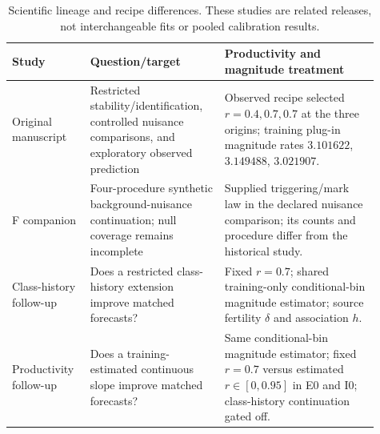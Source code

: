 \begin{table}[tbp]
\centering\small
\caption{Scientific lineage and recipe differences. These studies are
related releases, not interchangeable fits or pooled calibration results.}
\label{a2:recipe}
\begin{tabular}{>{\raggedright\arraybackslash}p{0.18\linewidth}>{\raggedright\arraybackslash}p{0.34\linewidth}>{\raggedright\arraybackslash}p{0.39\linewidth}}
\toprule
Study & Question/target & Productivity and magnitude treatment\\
\midrule
Original manuscript &
Restricted stability/identification, controlled nuisance comparisons,
and exploratory observed prediction &
Observed recipe selected \(r=0.4,0.7,0.7\) at the three origins;
training plug-in magnitude rates \(3.101622\), \(3.149488\), \(3.021907\).\\
F companion &
Four-procedure synthetic background-nuisance continuation; null
coverage remains incomplete &
Supplied triggering/mark law in the declared nuisance comparison;
its counts and procedure differ from the historical study.\\
Class-history follow-up &
Does a restricted class-history extension improve matched forecasts? &
Fixed \(r=0.7\); shared training-only conditional-bin magnitude
estimator; source fertility \(\delta\) and association \(h\).\\
Productivity follow-up &
Does a training-estimated continuous slope improve matched forecasts? &
Same conditional-bin magnitude estimator;
fixed \(r=0.7\) versus estimated \(r\in[0,0.95]\) in E0 and I0;
class-history continuation gated off.\\
\bottomrule
\end{tabular}
\end{table}
